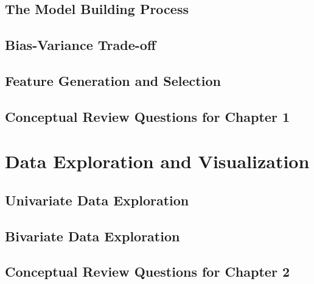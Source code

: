 \documentclass[
  10pt,
]{krantz}
\begin{document}
\section{The Model Building Process}\label{the-model-building-process}

\section{Bias-Variance Trade-off}\label{bias-variance-trade-off}

\section{Feature Generation and Selection}\label{feature-generation-and-selection}

\section{Conceptual Review Questions for Chapter 1}\label{conceptual-review-questions-for-chapter-1}

\chapter{Data Exploration and Visualization}\label{data-exploration-and-visualization}

\section{Univariate Data Exploration}\label{univariate-data-exploration}

\section{Bivariate Data Exploration}\label{bivariate-data-exploration}

\section{Conceptual Review Questions for Chapter 2}\label{conceptual-review-questions-for-chapter-2}

  

\printindex
\end{document}
